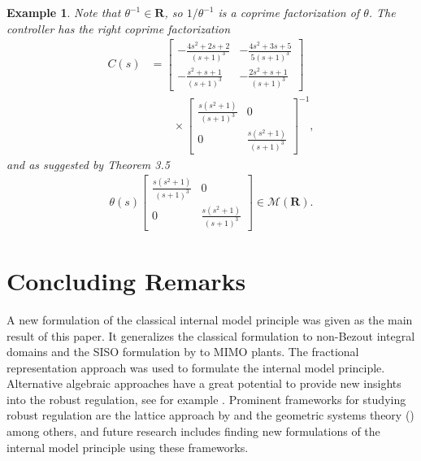 \documentclass[11pt, a4paper]{amsart}
\newcommand{\inv}{^{-1}}
\newtheorem{exa}{Example}
\newcommand{\matrices}[1]{\mathcal{M}\left( #1 \right)}		%
\newcommand{\Cont}{C}										%
\newcommand{\gen}{\theta}									%
\newcommand{\stable}{\mathbf{R}}							%
\begin{document}
\begin{exa}
Note that $\gen\inv\in\stable$, so $1/\gen\inv$ is a coprime factorization of $\gen$. The controller has the right coprime factorization
\begin{align*}
\Cont(s)& =\begin{bmatrix}
-\frac{4s^2 + 2s + 2}{(s+1)^3} &  -\frac{4s^2 + 3s + 5}{5(s+1)^3} \\
-\frac{s^2 + s + 1}{(s+1)^3} & -\frac{2s^2 + s + 1}{(s+1)^3}
\end{bmatrix}\\
& \qquad
\times\begin{bmatrix}
\frac{s(s^2+1)}{(s+1)^3} &  0 \\
0 & \frac{s(s^2+1)}{(s+1)^3}
\end{bmatrix}\inv,
\end{align*}
and as suggested by Theorem 3.5
\begin{align*}
\gen(s)\begin{bmatrix}
\frac{s(s^2+1)}{(s+1)^3} &  0 \\
0 & \frac{s(s^2+1)}{(s+1)^3}
\end{bmatrix}\in\matrices{\stable}.
\end{align*}
\end{exa}






\section{Concluding Remarks}\label{sec:Conclusions}

A new formulation of the classical internal model principle was given as the main result of this paper. It generalizes the classical formulation to non-Bezout integral domains and the SISO formulation by \cite{LaakkonenQuadrat2015} to MIMO plants. The fractional representation approach was used to formulate the internal model principle. Alternative algebraic approaches have a great potential to provide new insights into the robust regulation, see for example \cite{LaakkonenQuadrat2015}. Prominent frameworks for studying robust regulation are the lattice approach by \cite{Quadrat2006} and the geometric systems theory (\cite{Falb1999}) among others, and future research includes finding new formulations of the internal model principle using these frameworks.
\end{document}
